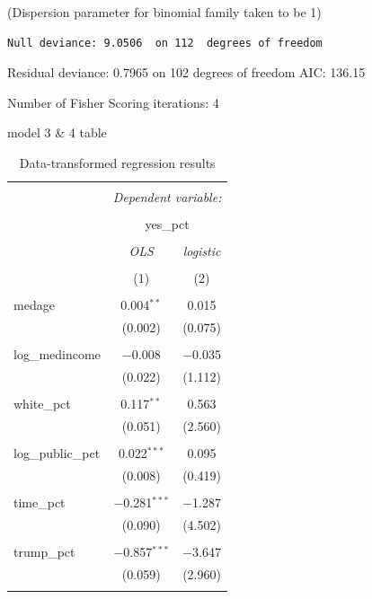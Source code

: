 \documentclass[
]{article}
\begin{document}
(Dispersion parameter for binomial family taken to be 1)

\begin{verbatim}
Null deviance: 9.0506  on 112  degrees of freedom
\end{verbatim}

Residual deviance: 0.7965 on 102 degrees of freedom AIC: 136.15

Number of Fisher Scoring iterations: 4

model 3 \& 4 table

\begin{table}[!htbp] \centering 
  \caption{Data-transformed regression results} 
  \label{transformedResults} 
\begin{tabular}{@{\extracolsep{5pt}}lcc} 
\\[-1.8ex]\hline 
\hline \\[-1.8ex] 
 & \multicolumn{2}{c}{\textit{Dependent variable:}} \\ 
\cline{2-3} 
\\[-1.8ex] & \multicolumn{2}{c}{yes\_pct} \\ 
\\[-1.8ex] & \textit{OLS} & \textit{logistic} \\ 
\\[-1.8ex] & (1) & (2)\\ 
\hline \\[-1.8ex] 
 medage & 0.004$^{**}$ & 0.015 \\ 
  & (0.002) & (0.075) \\ 
  & & \\ 
 log\_medincome & $-$0.008 & $-$0.035 \\ 
  & (0.022) & (1.112) \\ 
  & & \\ 
 white\_pct & 0.117$^{**}$ & 0.563 \\ 
  & (0.051) & (2.560) \\ 
  & & \\ 
 log\_public\_pct & 0.022$^{***}$ & 0.095 \\ 
  & (0.008) & (0.419) \\ 
  & & \\ 
 time\_pct & $-$0.281$^{***}$ & $-$1.287 \\ 
  & (0.090) & (4.502) \\ 
  & & \\ 
 trump\_pct & $-$0.857$^{***}$ & $-$3.647 \\ 
  & (0.059) & (2.960) \\ 
  & & \\ 

\end{tabular}
\end{table}
\end{document}
